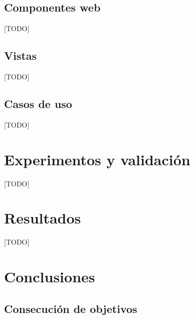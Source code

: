 \documentclass[a4paper, 12pt]{book}
\begin{document}
\section{Componentes web} 
\label{sec:web_components}
[TODO]

\section{Vistas} 
\label{sec:views}
[TODO]

\section{Casos de uso} 
\label{sec:use_cases}
[TODO]




\cleardoublepage
\chapter{Experimentos y validación}

[TODO]



\cleardoublepage
\chapter{Resultados}

[TODO]



\cleardoublepage
\chapter{Conclusiones}
\label{chap:conclusiones}


\section{Consecución de objetivos}
\label{sec:consecucion-objetivos}
\end{document}
